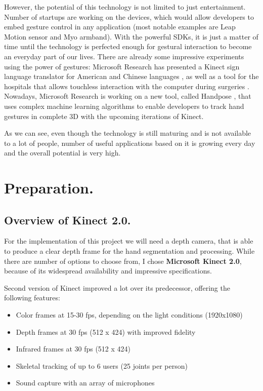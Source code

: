 \documentclass[a4paper,11pt,oneside]{article}
\begin{document}
However, the potential of this technology is not limited to just entertainment. Number of startups are working on the devices, which would allow developers to embed gesture control in any application (most notable examples are Leap Motion sensor and Myo armband). With the powerful SDKs, it is just a matter of time until the technology is perfected enough for gestural interaction to become an everyday part of our lives. There are already some impressive experiments using the power of gestures: Microsoft Research has presented a Kinect sign language translator for American and Chinese languages \cite{MS02}, as well as a tool for the hospitals that allows touchless interaction with the computer during surgeries \cite{MS03}. Nowadays, Microsoft Research is working on a new tool, called Handpose \cite{MS04}, that uses complex machine learning algorithms to enable developers to track hand gestures in complete 3D with the upcoming iterations of Kinect.

As we can see, even though the technology is still maturing and is not available to a lot of people, number of useful applications based on it is growing every day and the overall potential is very high.

\section{Preparation.}

\subsection{Overview of Kinect 2.0.}

For the implementation of this project we will need a depth camera, that is able to produce a clear depth frame for the hand segmentation and processing. While there are number of options to choose from, I chose \textbf{Microsoft Kinect 2.0}, because of its widespread availability and impressive specifications.

Second version of Kinect improved a lot over its predecessor, offering the following features:

\begin{itemize}
\item Color frames at 15-30 fps, depending on the light conditions (1920x1080)
\item Depth frames at 30 fps (512 x 424) with improved fidelity
\item Infrared frames at 30 fps (512 x 424)
\item Skeletal tracking of up to 6 users (25 joints per person)
\item Sound capture with an array of microphones
\end{itemize}
\end{document}
